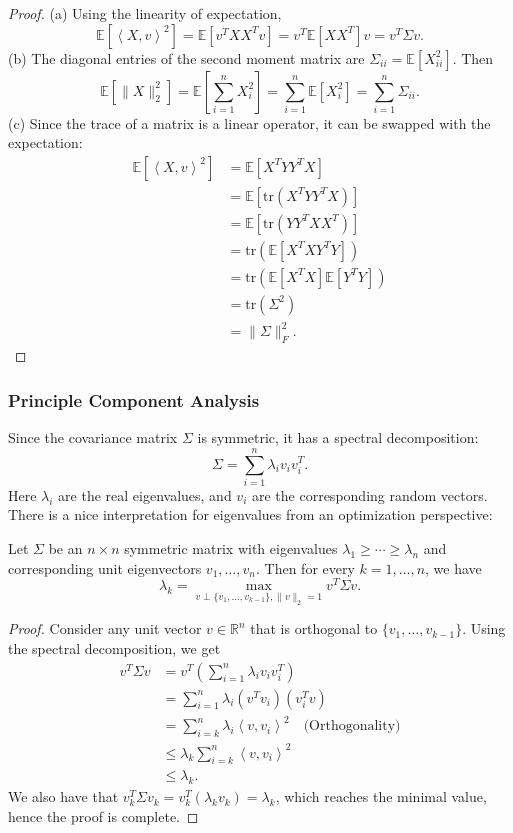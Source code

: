 \begin{proof}
(a) Using the linearity of expectation, 
\[ \mathbb{E}[\left\langle X, v \right\rangle^2] = \mathbb{E}[v^T XX^T v]
= v^T \mathbb{E}[XX^T] v = v^T \Sigma v. \]
(b) The diagonal entries of the second moment matrix are $\Sigma_{ii} = \mathbb{E}[X_{ii}^2]$. Then 
\[ \mathbb{E}[\lVert X \rVert_{2}^2] = \mathbb{E}\left[ \sum_{i = 1}^{n} X_i^2 \right] 
= \sum_{i = 1}^{n}\mathbb{E}[X_i^2] = \sum_{i = 1}^{n} \Sigma_{ii}. \]
(c) Since the trace of a matrix is a linear operator, it can be swapped with the expectation: 
\begin{align*}
	\mathbb{E}[\left\langle X, v \right\rangle^2] 
	&= \mathbb{E}[X^T YY^T X] \\
	&= \mathbb{E}[\mathrm{tr}(X^T YY^T X)] \\
	&= \mathbb{E}[\mathrm{tr}(YY^T XX^T)] \\
	&= \mathrm{tr}(\mathbb{E}[X^T X Y^T Y]) \\
	&= \mathrm{tr}(\mathbb{E}[X^T X] \mathbb{E}[Y^T Y]) \\
	&= \mathrm{tr}(\Sigma^2) \\
	&= \lVert \Sigma \rVert_{F}^2.
\end{align*}
\end{proof}


\subsubsection{Principle Component Analysis}
Since the covariance matrix $\Sigma$ is symmetric, it has a spectral decomposition: 
\[ \Sigma = \sum_{i = 1}^{n} \lambda_i v_i v_i^T. \]
Here $\lambda_i$ are the real eigenvalues, and $v_i$ are the corresponding random vectors. There is a nice 
interpretation for eigenvalues from an optimization perspective: 

\begin{proposition}[]
\label{prop:3.2.2}
Let $\Sigma$ be an $n \times n$ symmetric matrix with eigenvalues $\lambda_1 \geq \cdots \geq \lambda_n$ 
and corresponding unit eigenvectors $v_1, \dots, v_n$. Then for every $k = 1, \dots, n$, we have 
\[ \lambda_k = \max_{v \perp \{v_1, \dots, v_{k - 1}\}, \lVert v \rVert_{2} = 1} v^T \Sigma v. \]
\end{proposition}

\begin{proof}
Consider any unit vector $v \in \mathbb{R}^n$ that is orthogonal to $\{v_1, \dots, v_{k - 1}\}$. Using 
the spectral decomposition, we get 
\begin{align*}
	v^T \Sigma v 
	&= v^T \left( \sum_{i = 1}^{n} \lambda_i v_i v_i^T \right) \\
	&= \sum_{i = 1}^{n} \lambda_i (v^T v_i)(v_i^T v) \\
	&= \sum_{i = k}^{n} \lambda_i \left\langle v, v_i \right\rangle^2 \quad \text{(Orthogonality)} \\
	&\leq \lambda_k \sum_{i = k}^{n} \left\langle v, v_i \right\rangle^2 \\
	&\leq \lambda_k.
\end{align*}
We also have that $v_k^T \Sigma v_k = v_k^T (\lambda_k v_k) = \lambda_k$, which reaches the minimal value, 
hence the proof is complete.
\end{proof}

